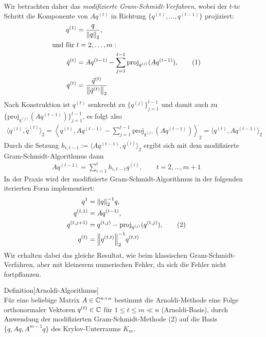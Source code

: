 Wir betrachten daher das \textit{modifizierte Gram-Schmidt-Verfahren}, wobei der $t$-te Schritt die Komponente
von $Aq^{(t)}$ in Richtung $\{q^{(1)},\dots,q^{(t-1)}\}$ projiziert:
%
\begin{align*}
  q^{(1)} 
  &= \dfrac{q}{\vertn{2}{q}_2},\\
  \text{und für } &t=2,\dots,m: \\
  \tilde{q}^{(t)} 
  &= Aq^{(t-1)} - \sum_{j=1}^{t-1} \text{proj}_{q^{(j)}}(Aq^{(t-1)}), 
  \tag{1}\label{eq:arnoldiEQ1}\\
  q^{(t)} &
  = \dfrac{\tilde{q}^{(t)}}{\vertn{2}{\tilde{q}^{(t)}}_2}
\end{align*}
%
Nach Konstruktion ist $q^{(t)}$ senkrecht zu $\{q^{(j)}\}_{j=1}^{t-1}$ und damit auch zu 
$\{\text{proj}_{q^{(j)}}(Aq^{(t-1)})\}_{j=1}^{t-1}$, es folgt also
% 
\begin{align*}
  \langle q^{(t)}, \tilde{q}^{(t)}\rangle_2 
  = \left\langle q^{(t)},Aq^{(t-1)} - \sum_{j=1}^{t-1} \text{proj}_{q^{(j)}}(Aq^{(t-1)})\right\rangle _2 
  = \langle q^{(t)}, Aq^{(t-1)}\rangle_2
\end{align*}
%
Durch die Setzung $h_{i,t-1} := \langle Aq^{(t-1)},q^{(i)} \rangle_2$ ergibt sich mit 
dem modifizierte Gram-Schmidt-Algorithmus dann
%
\begin{align*}
  Aq^{(t-1)}
  =\sum_{i=1}^{t} h_{i,t-1 }q^{(i)}, 
  \qquad t=2,\dots,m+1
\end{align*}
%
In der Praxis wird der modifizierte Gram-Schmidt-Algorithmus in der folgenden iterierten Form implementiert:
%
\begin{align*}
  q^1 &= \vertn{2}{q}_2^{-1}q, \\
  q^{(t,1)} &= Aq^{(t-1)}, \\
  q^{(t,j+1)} &= q^{(t,j)}-\text{proj}_{q^{(j)}}(q^{(t,j)}), 
  \tag{2}\label{eq:arnoldiEQ2}\\
  q^{(t)} &= \vertn{2}{q^{(t,t)}}_2^{-1}q^{(t,t)}
\end{align*}
%
Wir erhalten dabei das gleiche Resultat, wie beim klassischen Gram-Schmidt-Verfahren, 
aber mit kleinerem numerischen Fehler, da sich die Fehler nicht fortpflanzen.

\begin{colbox}{Definition}[Arnoldi-Algorithmus] \ \\
  Für eine beliebige Matrix $A\in\mathbb C  ^{n\times n}$ bestimmt die Arnoldi-Methode eine Folge orthonormaler 
  Vektoren $q^{(t)}\in\mathbb C  $ für $1\leq t \leq m \ll n$ (Arnoldi-Basis), durch Anwendung der modifizierten 
  Gram-Schmidt-Methode (2) auf die Basis $\{q,Aq,A^{m-1}q\}$ des Krylov-Unterraums $K_m$.
\end{colbox}

